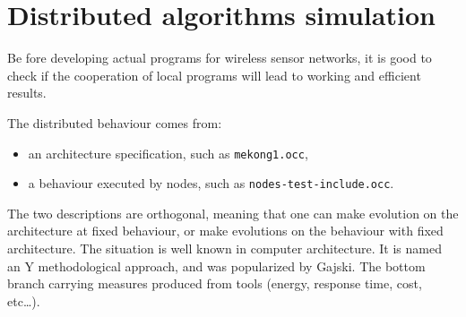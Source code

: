 
\chapter{Distributed algorithms simulation}

Be fore developing actual programs for wireless sensor networks, it
is good to check if the cooperation of local programs will lead
to working and efficient results.

The distributed behaviour comes from:

\begin{itemize}
\item an architecture specification, such as {\tt mekong1.occ},
\item a behaviour executed by nodes, such as {\tt nodes-test-include.occ}.
\end{itemize}

The two descriptions are orthogonal, meaning that one can make
evolution on the architecture at fixed behaviour, or make evolutions on
the behaviour with fixed architecture. The situation is well known
in computer architecture. It is named an Y methodological approach,
and was popularized by Gajski.
The bottom branch carrying measures produced from tools (energy, 
response time, cost, etc\ldots).



